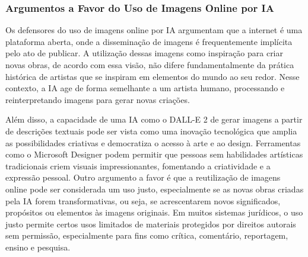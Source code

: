 \documentclass[referee,sn-basic]{sn-jnl}
\theoremstyle{thmstyleone}%
\begin{document}
\subsubsection{Argumentos a Favor do Uso de Imagens Online por IA}
\hspace{0.7cm}Os defensores do uso de imagens online por IA argumentam que a internet é uma plataforma aberta, onde a disseminação de imagens é frequentemente implícita pelo ato de publicar. A utilização dessas imagens como inspiração para criar novas obras, de acordo com essa visão, não difere fundamentalmente da prática histórica de artistas que se inspiram em elementos do mundo ao seu redor. Nesse contexto, a IA age de forma semelhante a um artista humano, processando e reinterpretando imagens para gerar novas criações.\par

Além disso, a capacidade de uma IA como o DALL-E 2 de gerar imagens a partir de descrições textuais pode ser vista como uma inovação tecnológica que amplia as possibilidades criativas e democratiza o acesso à arte e ao design. Ferramentas como o Microsoft Designer podem permitir que pessoas sem habilidades artísticas tradicionais criem visuais impressionantes, fomentando a criatividade e a expressão pessoal. Outro argumento a favor é que a reutilização de imagens online pode ser considerada um uso justo, especialmente se as novas obras criadas pela IA forem transformativas, ou seja, se acrescentarem novos significados, propósitos ou elementos às imagens originais. Em muitos sistemas jurídicos, o uso justo permite certos usos limitados de materiais protegidos por direitos autorais sem permissão, especialmente para fins como crítica, comentário, reportagem, ensino e pesquisa.\par
\end{document}
